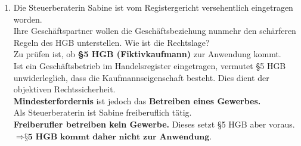 \documentclass[a4paper, 10pt]{article}
\begin{document}
\begin{enumerate}
        \item Die Steuerberaterin Sabine ist vom Registergericht versehentlich eingetragen worden.\\
        Ihre Geschäftspartner wollen die Geschäftsbeziehung nunmehr den schärferen Regeln des HGB unterstellen. Wie ist die Rechtslage?\\[2.5mm]
        Zu prüfen ist, ob \textbf{§5 HGB (Fiktivkaufmann)} zur Anwendung kommt.\\
        Ist ein Geschäftsbetrieb im Handelsregister eingetragen, vermutet §5 HGB unwiderleglich, dass die Kaufmannseigenschaft besteht. Dies dient der objektiven Rechtssicherheit.\\
        \textbf{Mindesterfordernis} ist jedoch das \textbf{Betreiben eines Gewerbes.}\\[2mm]
        Als Steuerberaterin ist Sabine freiberuflich tätig.\\
        \textbf{Freiberufler betreiben kein Gewerbe.} Dieses setzt §5 HGB aber voraus.\\[2.5mm]
        $\Longrightarrow \textbf{§5 HGB kommt daher nicht zur Anwendung.}$



\end{enumerate}
\end{document}
